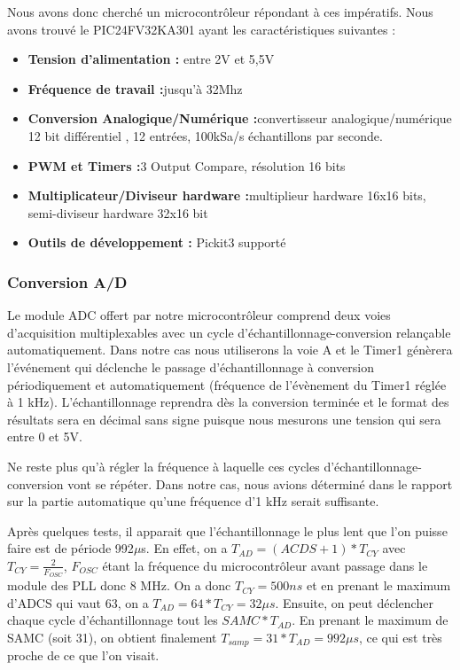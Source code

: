 \documentclass[11pt, french]{article} %
\begin{document}
Nous avons donc cherché un microcontrôleur répondant à ces impératifs. Nous avons trouvé le PIC24FV32KA301 ayant les caractéristiques suivantes :
\begin{itemize}
\item \textbf{Tension d'alimentation :} entre 2V et 5,5V
\item \textbf{Fréquence de travail :}jusqu'à 32Mhz
\item \textbf{Conversion Analogique/Numérique :}convertisseur analogique/numérique 12 bit différentiel , 12 entrées, 100kSa/s échantillons par seconde. 
\item \textbf{PWM et Timers :}3 Output Compare, résolution 16 bits
\item \textbf{Multiplicateur/Diviseur hardware :}multiplieur hardware 16x16 bits, semi-diviseur hardware 32x16 bit
\item \textbf{Outils de développement :} Pickit3 supporté

\end{itemize}

\subsubsection{Conversion A/D}

Le module ADC offert par notre microcontrôleur comprend deux voies d'acquisition multiplexables avec un cycle d'échantillonnage-conversion relançable automatiquement. Dans notre cas nous utiliserons la voie A et le Timer1 génèrera l'événement qui déclenche le passage d'échantillonnage à conversion périodiquement et automatiquement (fréquence de l'évènement du Timer1 réglée à 1 kHz). L'échantillonnage reprendra dès la conversion terminée et le format des résultats sera en décimal sans signe puisque nous mesurons une tension qui sera entre 0 et 5V. 

\vspace{0.5cm}

Ne reste plus qu'à régler la fréquence à laquelle ces cycles d'échantillonnage-conversion vont se répéter. Dans notre cas, nous avions déterminé dans le rapport sur la partie automatique qu'une fréquence d'1 kHz serait suffisante. 

\vspace{0.5cm}

Après quelques tests, il apparait que l'échantillonnage le plus lent que l'on puisse faire est de période 992$\mu$s. En effet, on a $T_{AD} = (ACDS+1) * T_{CY}$ avec $T_{CY} = \frac{2}{F_{OSC}}$, $F_{OSC}$ étant la fréquence du microcontrôleur avant passage dans le module des PLL donc 8 MHz. On a donc $T_{CY} = 500 ns$ et en prenant le maximum d'ADCS qui vaut 63, on a $T_{AD} = 64 * T_{CY} = 32 \mu s$. Ensuite, on peut déclencher chaque cycle d'échantillonnage tout les $SAMC * T_{AD}$. En prenant le maximum de SAMC (soit 31), on obtient finalement $T_{samp} = 31 * T_{AD} = 992 \mu s$, ce qui est très proche de ce que l'on visait.  
\end{document}
